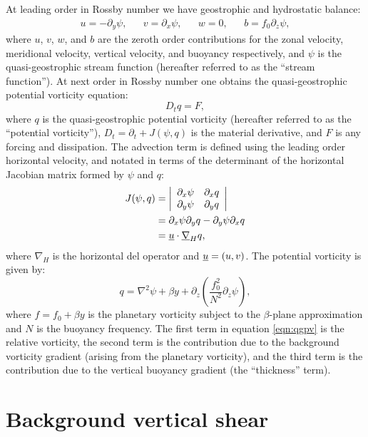 \documentclass[a4paper]{book}
\begin{document}
At leading order in Rossby number we have geostrophic and hydrostatic balance:
\begin{align}
  u = -\partial_y \psi, & & v = \partial_x \psi, & & w = 0, & & b = f_0 \partial_z \psi,
\end{align}
where $u$, $v$, $w$, and $b$ are the zeroth order contributions for the
zonal velocity, meridional velocity, vertical velocity, and buoyancy
respectively, and $\psi$ is the quasi-geostrophic stream function (hereafter
referred to as the ``stream function''). At next order in Rossby number
one obtains the quasi-geostrophic potential vorticity equation:
\begin{equation}\label{eqn:qgpv_equation}
  D_t q = F,
\end{equation}
where $q$ is the quasi-geostrophic potential vorticity (hereafter referred to as
the ``potential vorticity''), $D_t = \partial_t + J(\psi, q)$ is the
material derivative, and $F$ is any forcing and dissipation. The advection term
is defined using the leading order horizontal velocity, and notated in terms of
the determinant of the horizontal Jacobian matrix formed by $\psi$ and $q$:
\begin{align}
  J(\psi, q) & = \left| \begin{array}{cc}\partial_x \psi & \partial_x q \\ \partial_y \psi & \partial_y q \end{array}\right|  \nonumber \\
             & = \partial_x \psi \partial_y q - \partial_y \psi \partial_x q \nonumber \\
             & = \uline{u} \cdot \uline{\nabla}_H q,
\end{align}
where $\nabla_H$ is the horizontal del operator and
$\uline{u} = \left( u, v \right)$. The potential vorticity is given by:
\begin{equation}\label{eqn:qgpv}
  q = \nabla^2 \psi + \beta y + \partial_z \left( \frac{f_0^2}{N^2} \partial_z \psi \right),
\end{equation}
where $f = f_0 + \beta y$ is the planetary vorticity subject to the
$\beta$-plane approximation and $N$ is the buoyancy frequency. The first term
in equation \eqref{eqn:qgpv} is the relative vorticity, the second term is the
contribution due to the background vorticity gradient (arising from the
planetary vorticity), and the third term is the contribution due to the vertical
buoyancy gradient (the ``thickness'' term).

\section{Background vertical shear}\label{sect:shear}
\end{document}
